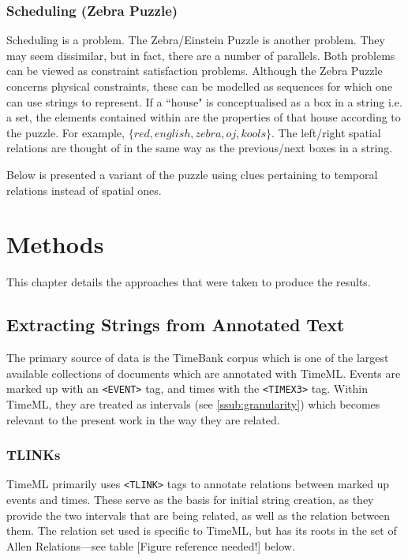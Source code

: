 \documentclass[a4paper,12pt,leqno]{article}
\newcommand{\xmltag}[2][]{\texttt{\textless{}#2#1\textgreater{}}}
\newcommand{\refneeded}[1][]{{\color{red}[Figure reference needed!#1]}}
\begin{document}
\subsubsection{Scheduling (Zebra Puzzle)}\label{ssub:zebra}
Scheduling is a problem. The Zebra/Einstein Puzzle is another problem. They may seem dissimilar, but in fact, there are a number of parallels. Both problems can be viewed as constraint satisfaction problems. Although the Zebra Puzzle concerns physical constraints, these can be modelled as sequences for which one can use strings to represent. If a ``house" is conceptualised as a box in a string i.e. a set, the elements contained within are the properties of that house according to the puzzle. For example, $\{red, english, zebra, oj, kools\}$. The left/right spatial relations are thought of in the same way as the previous/next boxes in a string.

Below is presented a variant of the puzzle using clues pertaining to temporal relations instead of spatial ones.

\newpage
\section{Methods}\label{sec:methods}
This chapter details the approaches that were taken to produce the results.

\subsection{Extracting Strings from Annotated Text}\label{sub:extracting}
The primary source of data is the TimeBank corpus which is one of the largest available collections of documents which are annotated with TimeML. Events are marked up with an \xmltag{EVENT} tag, and times with the \xmltag{TIMEX3} tag. Within TimeML, they are treated as intervals (see \ref{ssub:granularity}) which becomes relevant to the present work in the way they are related.

\subsubsection{TLINKs}\label{ssub:tlinks}
TimeML primarily uses \xmltag{TLINK} tags to annotate relations between marked up events and times. These serve as the basis for initial string creation, as they provide the two intervals that are being related, as well as the relation between them. The relation set used is specific to TimeML, but has its roots in the set of Allen Relations---see table \refneeded{} below.
\end{document}
